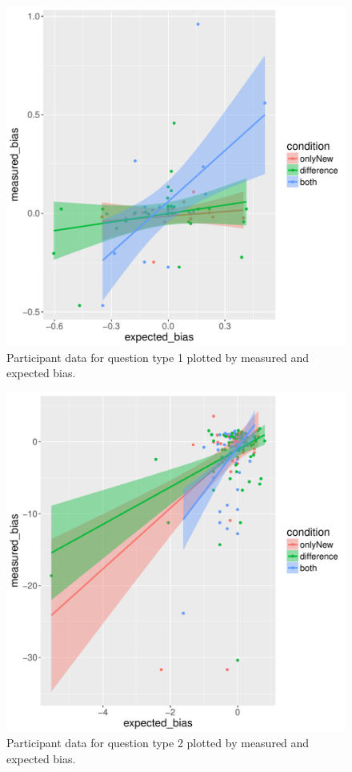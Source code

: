 \documentclass[10pt,journal,compsoc]{IEEEtran}
\begin{document}
\begin{figure}[!t]
  \centering
  \includegraphics[width=\columnwidth]{how_many_precise.pdf}
  \caption{Participant data for question type 1 plotted by measured and expected bias.}
  \label{figure_q1}
\end{figure}

\begin{figure}[!t]
  \centering
  \includegraphics[width=\columnwidth]{compare_precise.pdf}
  \caption{Participant data for question type 2 plotted by measured and expected bias.}
  \label{figure_q2}
\end{figure}
\end{document}
